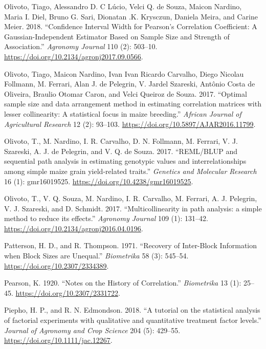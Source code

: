 \documentclass[
]{book}
\numberwithin{equation}{section}
\newlength{\cslhangindent}
\newenvironment{cslreferences}%
  {\setlength{\parindent}{0pt}%
  \everypar{\setlength{\hangindent}{\cslhangindent}}\ignorespaces}%
  {\par}
\begin{document}
\begin{cslreferences}
\leavevmode\hypertarget{ref-Olivoto2018}{}%
Olivoto, Tiago, Alessandro D. C Lúcio, Velci Q. de Souza, Maicon Nardino, Maria I. Diel, Bruno G. Sari, Dionatan .K. Krysczun, Daniela Meira, and Carine Meier. 2018. ``Confidence Interval Width for Pearson's Correlation Coefficient: A Gaussian-Independent Estimator Based on Sample Size and Strength of Association.'' \emph{Agronomy Journal} 110 (2): 503--10. \url{https://doi.org/10.2134/agronj2017.09.0566}.

\leavevmode\hypertarget{ref-Olivoto2017c}{}%
Olivoto, Tiago, Maicon Nardino, Ivan Ivan Ricardo Carvalho, Diego Nicolau Follmann, M. Ferrari, Alan J. de Pelegrin, V. Jardel Szareski, Antônio Costa de Oliveira, Braulio Otomar Caron, and Velci Queiroz de Souza. 2017. ``Optimal sample size and data arrangement method in estimating correlation matrices with lesser collinearity: A statistical focus in maize breeding.'' \emph{African Journal of Agricultural Research} 12 (2): 93--103. \url{https://doi.org/10.5897/AJAR2016.11799}.

\leavevmode\hypertarget{ref-Olivoto2017}{}%
Olivoto, T., M. Nardino, I. R. Carvalho, D. N. Follmann, M. Ferrari, V. J. Szareski, A. J. de Pelegrin, and V. Q. de Souza. 2017. ``REML/BLUP and sequential path analysis in estimating genotypic values and interrelationships among simple maize grain yield-related traits.'' \emph{Genetics and Molecular Research} 16 (1): gmr16019525. \url{https://doi.org/10.4238/gmr16019525}.

\leavevmode\hypertarget{ref-Olivoto2017f}{}%
Olivoto, T., V. Q. Souza, M. Nardino, I. R. Carvalho, M. Ferrari, A. J. Pelegrin, V. J. Szareski, and D. Schmidt. 2017. ``Multicollinearity in path analysis: a simple method to reduce its effects.'' \emph{Agronomy Journal} 109 (1): 131--42. \url{https://doi.org/10.2134/agronj2016.04.0196}.

\leavevmode\hypertarget{ref-Patterson1971}{}%
Patterson, H. D., and R. Thompson. 1971. ``Recovery of Inter-Block Information when Block Sizes are Unequal.'' \emph{Biometrika} 58 (3): 545--54. \url{https://doi.org/10.2307/2334389}.

\leavevmode\hypertarget{ref-Pearson1920}{}%
Pearson, K. 1920. ``Notes on the History of Correlation.'' \emph{Biometrika} 13 (1): 25--45. \url{https://doi.org/10.2307/2331722}.

\leavevmode\hypertarget{ref-Piepho2018}{}%
Piepho, H. P., and R. N. Edmondson. 2018. ``A tutorial on the statistical analysis of factorial experiments with qualitative and quantitative treatment factor levels.'' \emph{Journal of Agronomy and Crop Science} 204 (5): 429--55. \url{https://doi.org/10.1111/jac.12267}.


\end{cslreferences}
\end{document}
